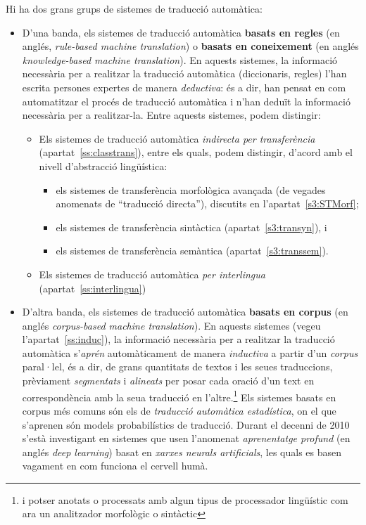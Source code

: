 Hi ha dos grans grups de sistemes de traducció automàtica:
\begin{itemize}
\item D'una banda, els sistemes de traducció automàtica \textbf{basats
    en regles} (en anglés, \emph{rule-based machine translation}) o
  \textbf{basats en coneixement} (en anglés \emph{knowledge-based
    machine translation}). En aquests sistemes, la informació
  necessària per a realitzar la traducció automàtica (diccionaris,
  regles) l'han escrita persones expertes de manera \emph{deductiva}:
  és a dir, han pensat en com automatitzar el procés de traducció automàtica i n'han
  deduït la informació necessària per a realitzar-la. Entre aquests
  sistemes, podem distingir:
  \begin{itemize}
  \item Els sistemes de traducció automàtica \emph{indirecta per
      transferència} (apartat~\ref{ss:classtrans}), entre els quals, podem distingir, d'acord amb el
    nivell d'abstracció lingüística:
    \begin{itemize}
    \item els sistemes de transferència morfològica avançada (de
      vegades anomenats de ``traducció directa''), discutits en l'apartat~\ref{s3:STMorf};
    \item els sistemes de transferència sintàctica (apartat~\ref{s3:transyn}), i
    \item els sistemes de transferència semàntica
      (apartat~\ref{s3:transsem}).
    \end{itemize}
  \item Els sistemes de traducció automàtica \emph{per interlingua}
    (apartat~\ref{ss:interlingua})
  \end{itemize}
\item D'altra banda, els sistemes de traducció automàtica
  \textbf{basats en corpus} (en anglés \emph{corpus-based machine
    translation}). En aquests sistemes (vegeu
  l'apartat~\ref{ss:induc}), la informació necessària per a realitzar
  la traducció automàtica s'\emph{aprén} automàticament  de manera \emph{inductiva}
  a partir d'un \emph{corpus} paral·lel, és a dir, de
  grans quantitats de textos i les seues traduccions, prèviament
  \emph{segmentats} i \emph{alineats} per posar cada oració d'un text
  en correspondència amb la seua traducció en l'altre.\footnote{i
    potser anotats o processats amb algun tipus de processador
    lingüístic com ara un analitzador morfològic o sintàctic} Els
  sistemes basats en corpus més comuns són els de \emph{traducció
    automàtica estadística}, on el que s'aprenen són models
  probabilístics de traducció. Durant el decenni de 2010 s'està
  investigant en sistemes que usen l'anomenat \emph{aprenentatge
    profund} (en anglés \emph{deep learning}) basat en \emph{xarxes neurals artificials}, les quals es
  basen vagament en com funciona el cervell humà. 
\end{itemize}
 
